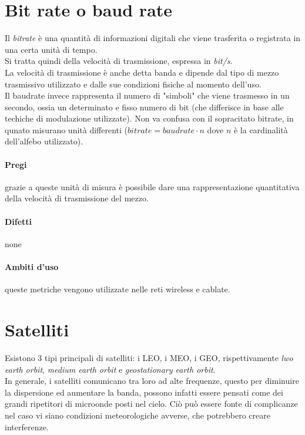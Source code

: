 \documentclass{article}
\begin{document}
\section{Bit rate o baud rate}

Il \textit{bitrate} è una quantità di informazioni digitali che viene trasferita
o registrata in una certa unità di tempo. \\
Si tratta quindi della velocità di trasmissione, espressa in \textit{bit/s}. \\
La velocità di trasmissione è anche detta banda e dipende dal tipo di mezzo
trasmissivo utilizzato e dalle sue condizioni fisiche al momento dell'uso. \\
Il baudrate invece rappresenta il numero di "simboli" che viene trasmesso in un
secondo, ossia un determinato e fisso numero di bit (che differisce in base alle
techiche di modulazione utilizzate). Non va confusa con il sopracitato bitrate,
in qunato misurano unità differenti ($bitrate = baudrate \cdot n$ dove $n$ è la
cardinalità dell'alfebo utilizzato).

\paragraph{Pregi} grazie a queste unità di misura è possibile dare una
rappresentazione quantitativa della velocità di trasmissione del mezzo.

\paragraph{Difetti} none

\paragraph{Ambiti d'uso} queste metriche vengono utilizzate nelle reti wireless
e cablate.

\section{Satelliti}

Esistono 3 tipi principali di satelliti: i LEO, i MEO, i GEO, rispettivamente
\textit{lwo earth orbit}, \textit{medium earth orbit} e \textit{geostationary
earth orbit}. \\
In generale, i satelliti comunicano tra loro ad alte frequenze, questo per
diminuire la dispersione ed aumentare la banda, possono infatti essere pensati
come dei grandi ripetitori di microonde posti nel cielo. Ciò può essere fonte di
complicanze nel caso vi siano condizioni meteorologiche avverse, che potrebbero
creare interferenze.
\end{document}
